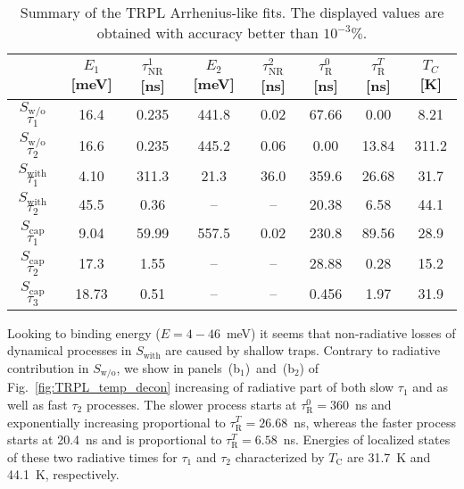 \begin{table}
	\centering
	\caption{Summary of the TRPL Arrhenius-like fits. The displayed values are obtained with accuracy better than $10^{-3}\%$.}
	\begin{tabularx}{0.95\textwidth}{cCCccccc}
		\toprule
		
		& $E_1$ [meV]& $\tau_\mathrm{NR}^1$ [ns]& $E_2$ [meV]& $\tau_\mathrm{NR}^2$ [ns] & $\tau_\mathrm{R}^0$ [ns]& $\tau_\mathrm{R}^T$ [ns]& $T_C$ [K]\\ 	
		\midrule
		\midrule
		$S_\mathrm{w/o}$ $\tau_1$& 16.4&0.235&441.8 & 0.02& 67.66&0.00&8.21\\
		$S_\mathrm{w/o}$ $\tau_2$& 16.6&0.235&445.2 & 0.06& 0.00&13.84&311.2\\
		\midrule
		
		$S_\mathrm{with}$ $\tau_1$&4.10 & 311.3& 21.3&36.0& 359.6&26.68&31.7\\
		$S_\mathrm{with}$ $\tau_2$&45.5 & 0.36& --&--& 20.38&6.58&44.1\\
		\midrule
		
		$S_\mathrm{cap}$ $\tau_1$& 9.04&59.99&557.5 & 0.02& 230.8&89.56&28.9\\ %
		$S_\mathrm{cap}$ $\tau_2$& 17.3&1.55&-- & --& 28.88&0.28&15.2\\ %
		$S_\mathrm{cap}$ $\tau_3$& 18.73&0.51&-- & --& 0.456&1.97&31.9\\
		
		\bottomrule
	\end{tabularx}\label{tab:TRPL_params}
\end{table}

Looking to binding energy ($E=4-46$~meV) it seems that non-radiative losses of dynamical processes in $S_\mathrm{with}$ are caused by shallow traps. Contrary to radiative contribution in $S_\mathrm{w/o}$, we show in panels~(b$_1$)~and~(b$_2$) of Fig.~\ref{fig:TRPL_temp_decon} increasing of radiative part of both slow $\tau_1$ and as well as fast $\tau_2$ processes. The slower process starts at $\tau_\mathrm{R}^0=360$~ns and exponentially increasing proportional to $\tau_\mathrm{R}^T=26.68$~ns, whereas the faster process starts at 20.4~ns and is proportional to $\tau_\mathrm{R}^T=6.58$~ns. Energies of localized states of these two radiative times for $\tau_1$ and $\tau_2$ characterized by $T_\mathrm{C}$ are 31.7~K and 44.1~K, respectively.

